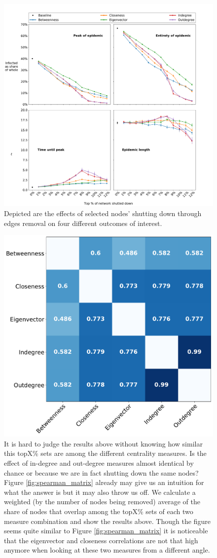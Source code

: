 \documentclass{Template resources/netsci-project}
\begin{document}
\begin{figure}[!ht]
    \centering
    \includegraphics[width=\linewidth]{Figures/interest_outcomes.pdf}
    \caption{Depicted are the effects of selected nodes' shutting down through edges removal on four different outcomes of interest.}
    \label{fig:interest_outcomes}
\end{figure}

\begin{figure}[!ht]
    \centering
    \includegraphics[width=0.5\linewidth]{Figures/node_remove_overlap_matrix.pdf}
    \caption{It is hard to judge the results above without knowing how similar this topX\% sets are among the different centrality measures. Is the effect of in-degree and out-degree measures almost identical by chance or because we are in fact shutting down the same nodes? Figure \ref{fig:spearman_matrix} already may give us an intuition for what the answer is but it may also throw us off. We calculate a weighted (by the number of nodes being removed) average of the share of nodes that overlap among the topX\% sets of each two measure combination and show the results above. Though the figure seems quite similar to Figure \ref{fig:spearman_matrix} it is noticeable that the eigenvector and closeness correlations are not that high anymore when looking at these two measures from a different angle.}
    \label{fig:node_remove_overlap_matrix}
\end{figure}
\end{document}
